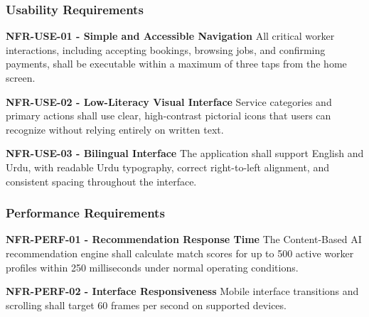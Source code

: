 \documentclass[12pt,a4paper]{article}
\begin{document}
\subsubsection{Usability Requirements}
\begin{list}{}{\setlength{\leftmargin}{1.5em}\setlength{\labelsep}{0.5em}\setlength{\topsep}{2pt}\setlength{\itemsep}{6pt}\setlength{\parsep}{0pt}}
\item[\textbullet] \textbf{NFR-USE-01 - Simple and Accessible Navigation}\newline{}
All critical worker interactions, including accepting bookings, browsing jobs, and confirming payments, shall be executable within a maximum of three taps from the home screen.

\item[\textbullet] \textbf{NFR-USE-02 - Low-Literacy Visual Interface}\newline{}
Service categories and primary actions shall use clear, high-contrast pictorial icons that users can recognize without relying entirely on written text.

\item[\textbullet] \textbf{NFR-USE-03 - Bilingual Interface}\newline{}
The application shall support English and Urdu, with readable Urdu typography, correct right-to-left alignment, and consistent spacing throughout the interface.
\end{list}

\subsubsection{Performance Requirements}
\begin{list}{}{\setlength{\leftmargin}{1.5em}\setlength{\labelsep}{0.5em}\setlength{\topsep}{2pt}\setlength{\itemsep}{6pt}\setlength{\parsep}{0pt}}
\item[\textbullet] \textbf{NFR-PERF-01 - Recommendation Response Time}\newline{}
The Content-Based AI recommendation engine shall calculate match scores for up to 500 active worker profiles within 250 milliseconds under normal operating conditions.

\item[\textbullet] \textbf{NFR-PERF-02 - Interface Responsiveness}\newline{}
Mobile interface transitions and scrolling shall target 60 frames per second on supported devices.
\end{list}
\end{document}
